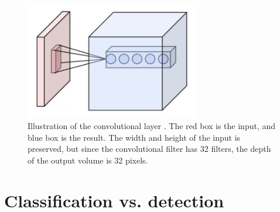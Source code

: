 \begin{figure}[h]
\begin{center}
  \includegraphics[width=3in]{../fig/cnn_conv.png}
  \caption{Illustration of the convolutional layer . The red box is the input, and blue box is the result. The width and height of the input is preserved, but since the convolutional filter has 32 filters, the depth of the output volume is 32 pixels.}
  \label{fig:cnn_layer}
\end{center}
\end{figure}

\section{Classification vs. detection}
\label{sec:object_detection}


